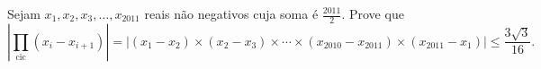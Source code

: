 Sejam $x_1, x_2, x_3, \dots, x_{2011}$ reais não negativos cuja soma é $\frac{2011}{2}$.
Prove que
$$\left | \prod_\mathrm{cic} (x_i - x_{i+1}) \right | =
\left | (x_1 - x_2) \times (x_2 - x_3) \times \cdots \times (x_{2010} - x_{2011}) \times (x_{2011} - x_1) \right | \le \frac{3\sqrt{3}}{16}.$$ 
